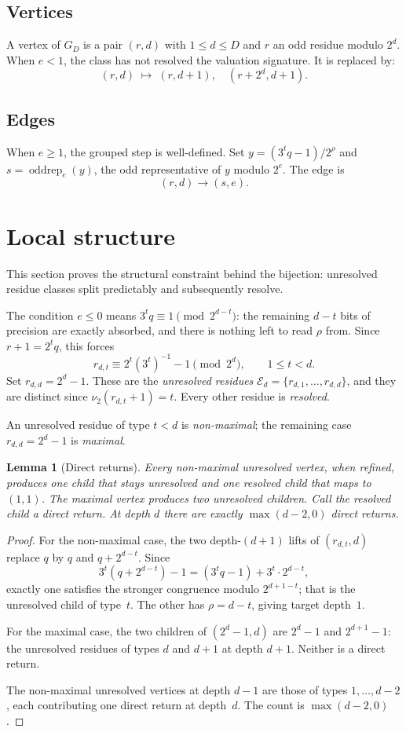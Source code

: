 \documentclass[11pt]{amsart}
\newtheorem{lemma}[theorem]{Lemma}
\theoremstyle{definition}
\theoremstyle{remark}
\newcommand{\nuu}{\nu_2}
\newcommand{\Ecal}{\mathcal E}
\newcommand{\oddrep}{\operatorname{oddrep}}
\begin{document}
\subsection{Vertices}
A vertex of $G_D$ is a pair $(r,d)$ with $1\le d\le D$ and $r$ an odd
residue modulo $2^d$.  When $e<1$, the class has not resolved the
valuation signature. It is replaced by:
\[
(r,d)\;\longmapsto\;(r,d+1),\quad (r+2^d,d+1).
\]

\subsection{Edges}
When $e\ge1$, the grouped step is well-defined.  Set
$y=(3^tq-1)/2^\rho$ and $s=\oddrep_e(y)$, the odd representative
of $y$ modulo $2^e$.  The edge is
\[
(r,d)\to(s,e).
\]

\section{Local structure}
This section proves the structural constraint behind the bijection: unresolved residue classes split predictably and subsequently resolve.

The condition $e\le0$ means $3^tq\equiv1\pmod{2^{d-t}}$: the
remaining $d-t$ bits of precision are exactly absorbed, and there is
nothing left to read $\rho$ from.  Since $r+1=2^tq$, this forces
\[
r_{d,t}\equiv 2^t(3^t)^{-1}-1\pmod{2^d},
\qquad 1\le t<d.
\]
Set $r_{d,d}=2^d-1$.  These are the
\emph{unresolved residues}
$\Ecal_d=\{r_{d,1},\ldots,r_{d,d}\}$, and they are distinct since
$\nuu(r_{d,t}+1)=t$.  Every other residue is \emph{resolved}.

An unresolved residue of type $t<d$ is \emph{non-maximal}; the
remaining case $r_{d,d}=2^d-1$ is \emph{maximal}.

\begin{lemma}[Direct returns]\label{lem:directreturns}
Every non-maximal unresolved vertex, when refined, produces one child
that stays unresolved and one resolved child that maps to $(1,1)$.
The maximal vertex produces two unresolved children.
Call the resolved child a \emph{direct return}.  At depth $d$ there are
exactly $\max(d-2,0)$ direct returns.
\end{lemma}

\begin{proof}
For the non-maximal case, the two depth-$(d+1)$ lifts of
$(r_{d,t},d)$ replace $q$ by $q$ and $q+2^{d-t}$.  Since
\[
3^t(q+2^{d-t})-1=(3^tq-1)+3^t\cdot 2^{d-t},
\]
exactly one satisfies the stronger congruence modulo $2^{d+1-t}$;
that is the unresolved child of type~$t$.  The other has $\rho=d-t$,
giving target depth~$1$.

For the maximal case, the two children of $(2^d-1,d)$ are $2^d-1$ and
$2^{d+1}-1$: the unresolved residues of types $d$ and $d+1$ at
depth $d+1$.  Neither is a direct return.

The non-maximal unresolved vertices at depth $d-1$ are those of types
$1,\ldots,d-2$, each contributing one direct return at depth~$d$.
The count is $\max(d-2,0)$.
\end{proof}
\end{document}
